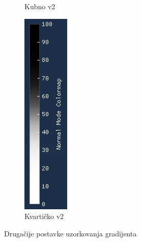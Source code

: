 \documentclass[times, utf8, diplomski]{fer}
\begin{document}
\begin{figure} [H]
\begin{subfigure}[h]{0.16\textwidth}
         \caption{Kubno v2}
         \label{fig:cubic_symmetrical_legend}
     \end{subfigure}
     \hfill
     \begin{subfigure}[h]{0.16\textwidth}
         \centering
         \includegraphics[width=\textwidth]{quartic_symmetrical_colormap.png}
         \caption{Kvartičko v2}
         \label{fig:quartic_symmetrical_legend}
     \end{subfigure}
        \caption{Drugačije postavke uzorkovanja gradijenta\\}
        \label{fig:colormap-legends}
\end{figure}
\end{document}
